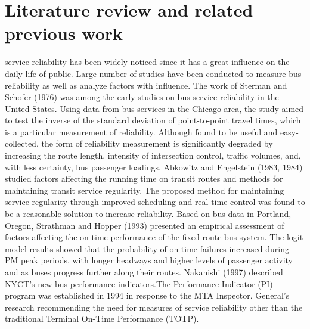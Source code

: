 \documentclass[12pt,journal,compsoc]{IEEEtran}
\begin{document}
\section{Literature review and related previous work}

 service reliability has been widely noticed since it has a great influence on the daily life of public. Large number of studies have been conducted to measure bus reliability as well as analyze factors with influence.
The work of Sterman and Schofer (1976) was among the early studies on bus service reliability in the United States. Using data from bus services in the Chicago area, the study aimed to test the inverse of the standard deviation of point-to-point travel times, which is a particular measurement of reliability. Although found to be useful and easy-collected, the form of reliability measurement is significantly degraded by increasing the route length, intensity of intersection control, traffic volumes, and, with less certainty, bus passenger loadings.
Abkowitz and Engelstein (1983, 1984) studied factors affecting the running time on transit routes and methods for maintaining transit service regularity. The proposed method for maintaining service regularity through improved scheduling and real-time control was found to be a reasonable solution to increase reliability.
Based on bus data in Portland, Oregon, Strathman and Hopper (1993) presented an empirical assessment of factors affecting the on-time performance of the fixed route bus system. The logit model results showed that the probability of on-time failures increased during PM peak periods, with longer headways and higher levels of passenger activity and as buses progress further along their routes.
Nakanishi (1997) described NYCT’s new bus performance indicators.The Performance Indicator (PI) program was established in 1994 in response to the MTA Inspector. General’s research recommending the need for measures of service reliability other than the traditional Terminal On-Time Performance (TOTP). 
\end{document}
